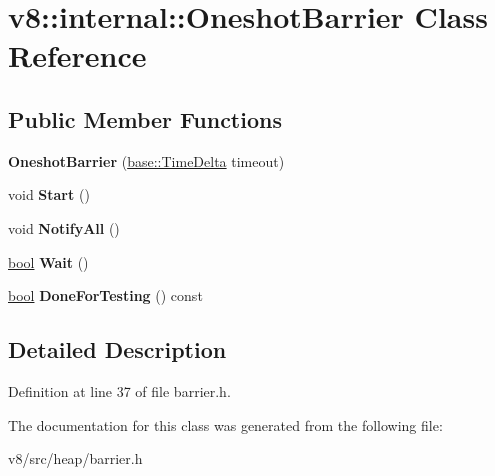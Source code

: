 \hypertarget{classv8_1_1internal_1_1OneshotBarrier}{}\section{v8\+:\+:internal\+:\+:Oneshot\+Barrier Class Reference}
\label{classv8_1_1internal_1_1OneshotBarrier}
\subsection*{Public Member Functions}
\begin{DoxyCompactItemize}
\item 
\mbox{\label{classv8_1_1internal_1_1OneshotBarrier_ac81136e315abf6056bf45b1715af4be3}} 
{\bfseries Oneshot\+Barrier} (\mbox{\hyperlink{classv8_1_1base_1_1TimeDelta}{base\+::\+Time\+Delta}} timeout)
\item 
\mbox{\label{classv8_1_1internal_1_1OneshotBarrier_a188824643885bcb0e38430c5962723d8}} 
void {\bfseries Start} ()
\item 
\mbox{\label{classv8_1_1internal_1_1OneshotBarrier_a574fa03c42a7659341fe48bb6d885269}} 
void {\bfseries Notify\+All} ()
\item 
\mbox{\label{classv8_1_1internal_1_1OneshotBarrier_ae7a0c7bcaf2af30e7818fcb739581d18}} 
\mbox{\hyperlink{classbool}{bool}} {\bfseries Wait} ()
\item 
\mbox{\label{classv8_1_1internal_1_1OneshotBarrier_a1b25c53b21ff8085722bbbb2888c83ee}} 
\mbox{\hyperlink{classbool}{bool}} {\bfseries Done\+For\+Testing} () const
\end{DoxyCompactItemize}


\subsection{Detailed Description}


Definition at line 37 of file barrier.\+h.



The documentation for this class was generated from the following file\+:\begin{DoxyCompactItemize}
\item 
v8/src/heap/barrier.\+h\end{DoxyCompactItemize}
